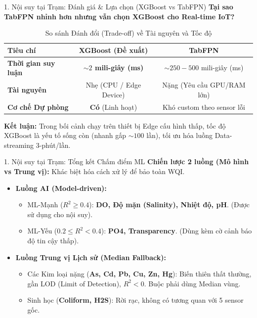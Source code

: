 \documentclass[aspectratio=169]{beamer}
\begin{document}
\begin{frame}{1. Nội suy tại Trạm: Đánh giá \& Lựa chọn (XGBoost vs TabFPN)}
    \textbf{Tại sao TabFPN nhỉnh hơn nhưng vẫn chọn XGBoost cho Real-time IoT?}

    \vspace{0.3cm}
    \begin{table}[]
        \centering
        \caption{So sánh Đánh đổi (Trade-off) về Tài nguyên và Tốc độ}
        \renewcommand{\arraystretch}{1.3}
        \begin{tabular}{lcc}
            \toprule
            \textbf{Tiêu chí}           & \textbf{XGBoost (Đề xuất)}       & \textbf{TabFPN}                 \\
            \midrule
            \textbf{Thời gian suy luận} & \textbf{$\sim 2$ mili-giây (ms)} & $\sim 250 - 500$ mili-giây (ms) \\
            \textbf{Tài nguyên}         & Nhẹ (CPU / Edge Device)          & Nặng (Yêu cầu GPU/RAM lớn)      \\
            \textbf{Cơ chế Dự phòng}    & \textbf{Có} (Linh hoạt)          & Khó custom theo sensor lỗi      \\
            \bottomrule
        \end{tabular}
    \end{table}

    \vspace{0.2cm}
    \textbf{Kết luận:} Trong bối cảnh chạy trên thiết bị Edge cấu hình thấp, tốc độ XGBoost là yếu tố sống còn (nhanh gấp $\sim100$ lần), tối ưu hóa luồng Data-streaming 3-phút/lần.
\end{frame}

\begin{frame}{1. Nội suy tại Trạm: Tổng kết Chấm điểm ML}
    \textbf{Chiến lược 2 luồng (Mô hình vs Trung vị):} Khác biệt hóa cách xử lý để bảo toàn WQI.
    \begin{itemize}
        \item \textbf{Luồng AI (Model-driven):}
              \begin{itemize}
                  \item ML-Mạnh ($R^2 \ge 0.4$): \textbf{DO, Độ mặn (Salinity), Nhiệt độ, pH}. (Được sử dụng cho nội suy).
                  \item ML-Yếu ($0.2 \le R^2 < 0.4$): \textbf{PO4, Transparency}. (Dùng kèm cờ cảnh báo độ tin cậy thấp).
              \end{itemize}
        \item \textbf{Luồng Trung vị Lịch sử (Median Fallback):}
              \begin{itemize}
                  \item Các Kim loại nặng (\textbf{As, Cd, Pb, Cu, Zn, Hg}): Biến thiên thất thường, gần LOD (Limit of Detection), $R^2 < 0$. Buộc phải dùng Median vùng.
                  \item Sinh học (\textbf{Coliform, H2S}): Rời rạc, không có tương quan với 5 sensor gốc.
              \end{itemize}
    \end{itemize}
\end{frame}
\end{document}
